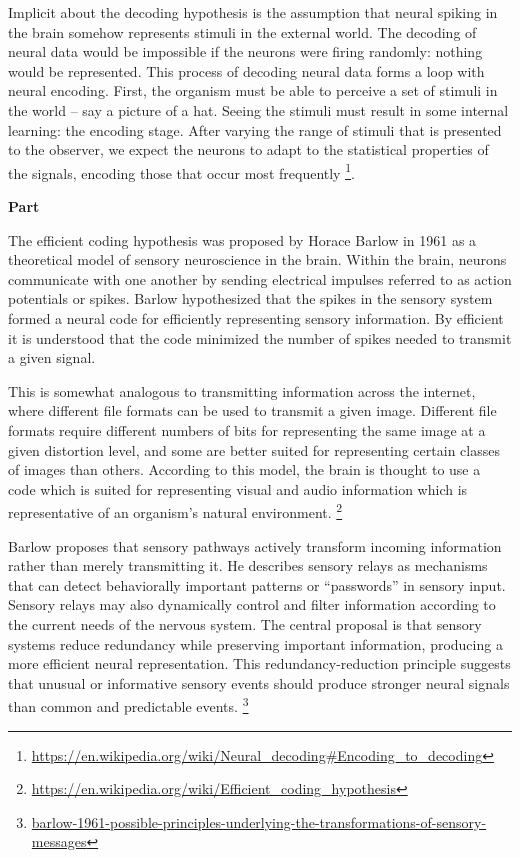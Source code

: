 \documentclass{book}
\providecommand{\ProjectDeepHeading}[2]{%
    \par\medskip\noindent\textbf{#2}\par\smallskip
}
\providecommand{\seeherefooter}[1]{\footnote{\url{#1}}}
\begin{document}

Implicit about the decoding hypothesis is the assumption that neural spiking in the brain somehow represents stimuli in the external world. The decoding of neural data would be impossible if the neurons were firing randomly: nothing would be represented. This process of decoding neural data forms a loop with neural encoding. First, the organism must be able to perceive a set of stimuli in the world – say a picture of a hat. Seeing the stimuli must result in some internal learning: the encoding stage. After varying the range of stimuli that is presented to the observer, we expect the neurons to adapt to the statistical properties of the signals, encoding those that occur most frequently \seeherefooter{https://en.wikipedia.org/wiki/Neural_decoding\#Encoding_to_decoding}.

\ProjectDeepHeading{7}{Part}


The efficient coding hypothesis was proposed by Horace Barlow in 1961 as a theoretical model of sensory neuroscience in the brain. Within the brain, neurons communicate with one another by sending electrical impulses referred to as action potentials or spikes. Barlow hypothesized that the spikes in the sensory system formed a neural code for efficiently representing sensory information. By efficient it is understood that the code minimized the number of spikes needed to transmit a given signal.

    This is somewhat analogous to transmitting information across the internet, where different file formats can be used to transmit a given image. Different file formats require different numbers of bits for representing the same image at a given distortion level, and some are better suited for representing certain classes of images than others. According to this model, the brain is thought to use a code which is suited for representing visual and audio information which is representative of an organism's natural environment.
    \seeherefooter{https://en.wikipedia.org/wiki/Efficient_coding_hypothesis}

    Barlow proposes that sensory pathways actively transform incoming information rather than merely transmitting it. He describes sensory relays as mechanisms that can detect behaviorally important patterns or ``passwords'' in sensory input. Sensory relays may also dynamically control and filter information according to the current needs of the nervous system. The central proposal is that sensory systems reduce redundancy while preserving important information, producing a more efficient neural representation. This redundancy-reduction principle suggests that unusual or informative sensory events should produce stronger neural signals than common and predictable events.
    \seeherefooter{barlow-1961-possible-principles-underlying-the-transformations-of-sensory-messages}
\end{document}

